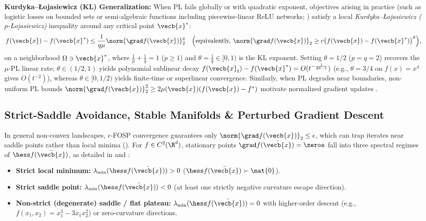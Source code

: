 \documentclass[../../../../master.tex]{subfiles}
\begin{document}
\textbf{Kurdyka--\L{}ojasiewicz (KL) Generalization:} When PL fails globally or with quadratic exponent, objectives arising in practice (such as logistic losses on bounded sets or semi-algebraic functions including piecewise-linear ReLU networks; ) satisfy a local \emph{Kurdyka--\L{}ojasiewicz ($p$-\L{}ojasiewicz)} inequality around any critical point $\vecb{x}^*$:
\begin{equation}
\label{eq:gdconv:kl_ineq}
  f(\vecb{x}) - f(\vecb{x}^*) \le \frac{1}{q\mu}\norm{\grad f(\vecb{x})}_2^q \quad \Big(\text{equivalently, } \norm{\grad f(\vecb{x})}_2 \ge c\big(f(\vecb{x}) - f(\vecb{x}^*)\big)^{\theta}\Big),
\end{equation}
on a neighborhood $\Omega \ni \vecb{x}^*$, where $\frac{1}{p} + \frac{1}{q} = 1$ ($p \ge 1$) and $\theta = \frac{1}{q} \in [0, 1)$ is the KL exponent. Setting $\theta = 1/2$ ($p=q=2$) recovers the $\mu$-PL linear rate; $\theta \in (1/2, 1)$ yields polynomial sublinear decay $f(\vecb{x}_t)-f(\vecb{x}^*) = O(t^{-\frac{1}{2\theta-1}})$ (e.g., $\theta = 3/4$ on $f(x)=x^4$ gives $O(t^{-2})$), whereas $\theta \in [0, 1/2)$ yields finite-time or superlinear convergence. Similarly, when PL degrades near boundaries, non-uniform PL bounds $\norm{\grad f(\vecb{x})}_2^2 \ge 2\mu(\vecb{x})(f(\vecb{x})-f^*)$ motivate normalized gradient updates .

\subsection{Strict-Saddle Avoidance, Stable Manifolds \& Perturbed Gradient Descent}
\label{subsec:gdconv:saddles}

In general non-convex landscapes, $\epsilon$-FOSP convergence guarantees only $\norm{\grad f(\vecb{x})}_2 \le \epsilon$, which can trap iterates near saddle points rather than local minima (). For $f \in C^2(\R^d)$, stationary points $\grad f(\bar{\vecb{x}}) = \zeros$ fall into three spectral regimes of $\hess f(\bar{\vecb{x}})$, as detailed in  and :
\begin{itemize}
  \item \textbf{Strict local minimum:} $\lambda_{\min}(\hess f(\bar{\vecb{x}})) > 0$ ($\hess f(\bar{\vecb{x}}) \succ \mat{0}$).
  \item \textbf{Strict saddle point:} $\lambda_{\min}(\hess f(\bar{\vecb{x}})) < 0$ (at least one strictly negative curvature escape direction).
  \item \textbf{Non-strict (degenerate) saddle / flat plateau:} $\lambda_{\min}(\hess f(\bar{\vecb{x}})) = 0$ with higher-order descent (e.g., $f(x_1, x_2) = x_1^3 - 3x_1 x_2^2$) or zero-curvature directions.
\end{itemize}
\end{document}
